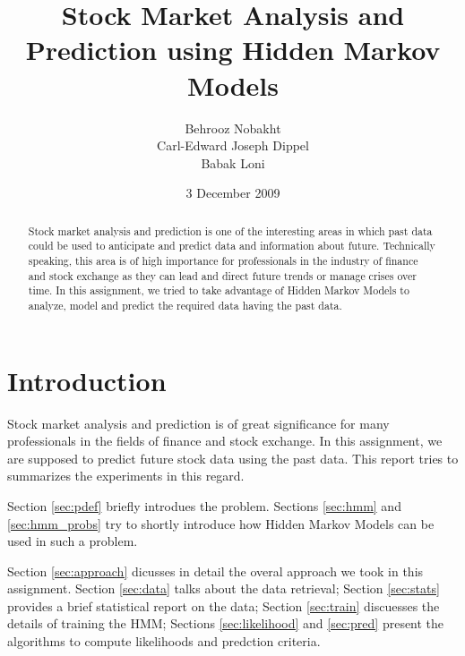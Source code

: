 \documentclass{acm_proc_article-sp}
\begin{document}
\title{Stock Market Analysis and Prediction using Hidden Markov Models}

\author{
  \alignauthor Behrooz Nobakht \\ 
  \alignauthor Carl-Edward Joseph Dippel\\ 
  \alignauthor Babak Loni\\ 
}

\date{3 December 2009}

\maketitle

\begin{abstract}
Stock market analysis and prediction is one of the interesting areas in which past data could be used to anticipate and
predict data and information about future. Technically speaking, this area is of high importance for professionals in
the industry of finance and stock exchange as they can lead and direct future trends or manage crises over time. In
this assignment, we tried to take advantage of Hidden Markov Models to analyze, model and predict the required data
having the past data.
\end{abstract}


\section{Introduction}
Stock market analysis and prediction is of great significance for many professionals in the fields of finance and stock
exchange. In this assignment, we are supposed to predict future stock data using the past data. This report tries to
summarizes the experiments in this regard.

Section \ref{sec:pdef} briefly introdues the problem. Sections \ref{sec:hmm} and \ref{sec:hmm_probs} try to shortly
introduce how Hidden Markov Models can be used in such a problem.

Section \ref{sec:approach} dicusses in detail the overal approach we took in this assignment. Section \ref{sec:data}
talks about the data retrieval; Section \ref{sec:stats} provides a brief statistical report on the data; Section
\ref{sec:train} discuesses the details of training the HMM; Sections \ref{sec:likelihood} and \ref{sec:pred} present
the algorithms to compute likelihoods and predction criteria. 
\end{document}
